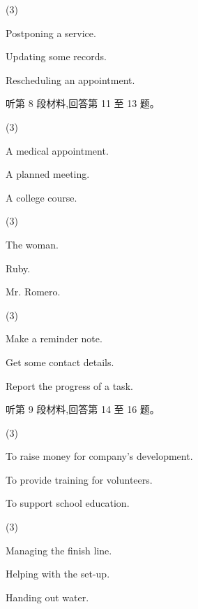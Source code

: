 \documentclass{英语试卷}
\begin{document}
\begin{choices}(3)
  \item Postponing a service.
  \item Updating some records.
  \item Rescheduling an appointment.
\end{choices}
\par 听第 8 段材料,回答第 11 至 13 题。\par
{}
\begin{choices}(3)
  \item A medical appointment.
  \item A planned meeting.
  \item A college course.
\end{choices}
\begin{choices}(3)
  \item The woman.
  \item Ruby.
  \item Mr. Romero.
\end{choices}
\begin{choices}(3)
  \item Make a reminder note.
  \item Get some contact details.
  \item Report the progress of a task.
\end{choices}
\par 听第 9 段材料,回答第 14 至 16 题。\par
{}
\begin{choices}(3)
  \item To raise money for company's development.
  \item To provide training for volunteers.
  \item To support school education.
\end{choices}
\begin{choices}(3)
  \item Managing the finish line.
  \item Helping with the set-up.
  \item Handing out water.
\end{choices}
\end{document}
